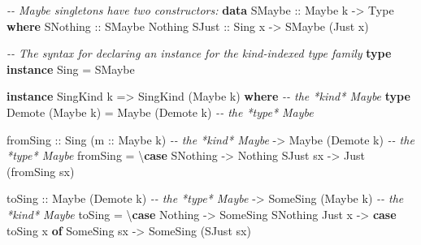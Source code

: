 \documentclass[]{article}
\newenvironment{Shaded}{}{}
\newcommand{\CommentTok}[1]{\textcolor[rgb]{0.38,0.63,0.69}{\textit{#1}}}
\newcommand{\DataTypeTok}[1]{\textcolor[rgb]{0.56,0.13,0.00}{#1}}
\newcommand{\KeywordTok}[1]{\textcolor[rgb]{0.00,0.44,0.13}{\textbf{#1}}}
\newcommand{\NormalTok}[1]{#1}
\newcommand{\OtherTok}[1]{\textcolor[rgb]{0.00,0.44,0.13}{#1}}
\begin{document}
\begin{Shaded}
\begin{Highlighting}[]
\CommentTok{{-}{-} Maybe singletons have two constructors:}
\KeywordTok{data} \DataTypeTok{SMaybe}\OtherTok{ ::} \DataTypeTok{Maybe}\NormalTok{ k }\OtherTok{{-}>} \DataTypeTok{Type} \KeywordTok{where}
    \DataTypeTok{SNothing}\OtherTok{ ::} \DataTypeTok{SMaybe} \DataTypeTok{\textquotesingle{}Nothing}
    \DataTypeTok{SJust}\OtherTok{    ::} \DataTypeTok{Sing}\NormalTok{ x }\OtherTok{{-}>} \DataTypeTok{SMaybe}\NormalTok{ (}\DataTypeTok{\textquotesingle{}Just}\NormalTok{ x)}

\CommentTok{{-}{-} The syntax for declaring an instance for the kind{-}indexed type family}
\KeywordTok{type} \KeywordTok{instance} \DataTypeTok{Sing} \OtherTok{=} \DataTypeTok{SMaybe}

\KeywordTok{instance} \DataTypeTok{SingKind}\NormalTok{ k }\OtherTok{=>} \DataTypeTok{SingKind}\NormalTok{ (}\DataTypeTok{Maybe}\NormalTok{ k) }\KeywordTok{where}     \CommentTok{{-}{-} the *kind* Maybe}
    \KeywordTok{type} \DataTypeTok{Demote}\NormalTok{ (}\DataTypeTok{Maybe}\NormalTok{ k) }\OtherTok{=} \DataTypeTok{Maybe}\NormalTok{ (}\DataTypeTok{Demote}\NormalTok{ k)        }\CommentTok{{-}{-} the *type* Maybe}

\NormalTok{    fromSing}
\OtherTok{        ::} \DataTypeTok{Sing}\NormalTok{ (}\OtherTok{m ::} \DataTypeTok{Maybe}\NormalTok{ k)        }\CommentTok{{-}{-} the *kind* Maybe}
        \OtherTok{{-}>} \DataTypeTok{Maybe}\NormalTok{ (}\DataTypeTok{Demote}\NormalTok{ k)           }\CommentTok{{-}{-} the *type* Maybe}
\NormalTok{    fromSing }\OtherTok{=}\NormalTok{ \textbackslash{}}\KeywordTok{case}
        \DataTypeTok{SNothing} \OtherTok{{-}>} \DataTypeTok{Nothing}
        \DataTypeTok{SJust}\NormalTok{ sx }\OtherTok{{-}>} \DataTypeTok{Just}\NormalTok{ (fromSing sx)}

\NormalTok{    toSing}
\OtherTok{        ::} \DataTypeTok{Maybe}\NormalTok{ (}\DataTypeTok{Demote}\NormalTok{ k)             }\CommentTok{{-}{-} the *type* Maybe}
        \OtherTok{{-}>} \DataTypeTok{SomeSing}\NormalTok{ (}\DataTypeTok{Maybe}\NormalTok{ k)           }\CommentTok{{-}{-} the *kind* Maybe}
\NormalTok{    toSing }\OtherTok{=}\NormalTok{ \textbackslash{}}\KeywordTok{case}
        \DataTypeTok{Nothing} \OtherTok{{-}>} \DataTypeTok{SomeSing} \DataTypeTok{SNothing}
        \DataTypeTok{Just}\NormalTok{ x  }\OtherTok{{-}>} \KeywordTok{case}\NormalTok{ toSing x }\KeywordTok{of}
          \DataTypeTok{SomeSing}\NormalTok{ sx }\OtherTok{{-}>} \DataTypeTok{SomeSing}\NormalTok{ (}\DataTypeTok{SJust}\NormalTok{ sx)}
\end{Highlighting}
\end{Shaded}
\end{document}
